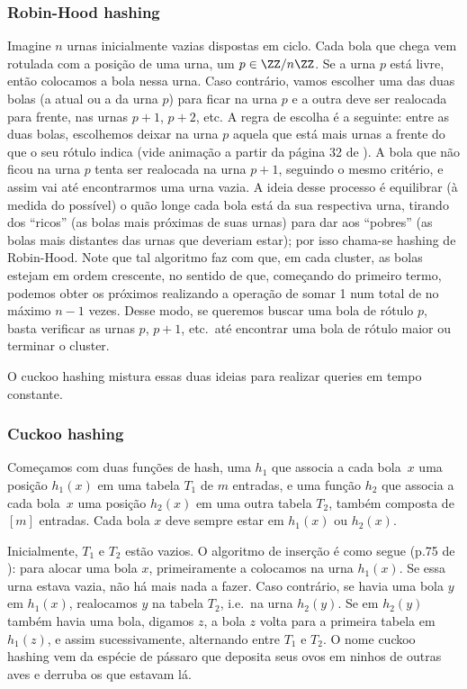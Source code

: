 \subsubsection{Robin-Hood hashing} Imagine $n$ urnas inicialmente vazias dispostas em ciclo. Cada bola que chega vem rotulada com a posição de uma urna, um $p\in\ZZ/n\ZZ$. Se a urna $p$ está livre, então colocamos a bola nessa urna. Caso contrário, vamos escolher uma das duas bolas (a atual ou a da urna $p$) para ficar na urna $p$ e a outra deve ser realocada para frente, nas urnas $p+1$, $p+2$, etc. A regra de escolha é a seguinte: entre as duas bolas, escolhemos deixar na urna $p$ aquela que está mais urnas a frente do que o seu rótulo indica (vide animação a partir da página 32 de \cite{1}). A bola que não ficou na urna $p$ tenta ser realocada na urna $p+1$, seguindo o mesmo critério, e assim vai até encontrarmos uma urna vazia. A ideia desse processo é equilibrar (à medida do possível) o quão longe cada bola está da sua respectiva urna, tirando dos ``ricos'' (as bolas mais próximas de suas urnas) para dar aos ``pobres'' (as bolas mais distantes das urnas que deveriam estar); por isso chama-se hashing de Robin-Hood. Note que tal algoritmo faz com que, em cada cluster, as bolas estejam em ordem crescente, no sentido de que, começando do primeiro termo, podemos obter os próximos realizando a operação de somar 1 num total de no máximo $n-1$ vezes. Desse modo, se queremos buscar uma bola de rótulo $p$, basta verificar as urnas $p$, $p+1$, etc.\ até encontrar uma bola de rótulo maior ou terminar o cluster.

O cuckoo hashing mistura essas duas ideias para realizar queries em tempo constante.

\subsubsection{Cuckoo hashing} Começamos com duas funções de hash, uma $h_1$ que associa a cada bola~$x$ uma posição $h_1(x)$ em uma tabela $T_1$ de $m$ entradas, e uma função $h_2$ que associa a cada bola~$x$ uma posição $h_2(x)$ em uma outra tabela $T_2$, também composta de $[m]$ entradas. Cada bola $x$ deve sempre estar em $h_1(x)$ ou $h_2(x)$.

Inicialmente, $T_1$ e $T_2$ estão vazios. O algoritmo de inserção é como segue (p.75 de \cite{1}): para alocar uma bola $x$, primeiramente a colocamos na urna $h_1(x)$. Se essa urna estava vazia, não há mais nada a fazer. Caso contrário, se havia uma bola $y$ em $h_1(x)$, realocamos $y$ na tabela $T_2$, i.e.\ na urna $h_2(y)$. Se em $h_2(y)$ também havia uma bola, digamos $z$, a bola $z$ volta para a primeira tabela em $h_1(z)$, e assim sucessivamente, alternando entre $T_1$ e $T_2$. O nome cuckoo hashing vem da espécie de pássaro que deposita seus ovos em ninhos de outras aves e derruba os que estavam lá.


